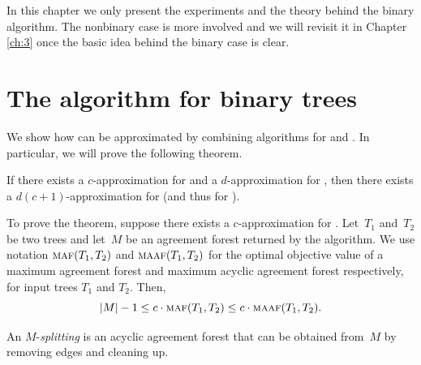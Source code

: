 In this chapter we only present the experiments and the theory behind the binary algorithm. The nonbinary case is more involved and we will revisit it in Chapter \ref{ch:3} once the basic idea behind the binary case is clear. 



\section{The algorithm for binary trees}\label{sec:binalg}

We show how \maaf can be approximated by combining algorithms for \maf and \dfvs. In particular, we will prove the following theorem.

\begin{theorem}\label{thm:appr}
If there exists a $c$-approximation for \maf and a $d$-approximation for \dfvs, then there exists a $d(c+1)$-approximation for \maaf (and thus for \mh).
\end{theorem}


To prove the theorem, suppose there exists a $c$-approximation for {\maf}. Let~$T_1$ and~$T_2$ be two trees and let~$M$ be an agreement forest returned by the algorithm. We use notation $\text{{\sc maf}}(T_1,T_2)$ and $\text{{\sc maaf}}(T_1,T_2)$ for the optimal objective value of a maximum agreement forest and maximum acyclic agreement forest respectively, for input trees $T_1$ and $T_2$. Then,
\begin{equation}\label{eq:mafmaaf}
|M| -1   \leq c \cdot \text{{\sc maf}}(T_1,T_2) \leq c\cdot \text{{\sc maaf}}(T_1,T_2).
\end{equation}

An $M$-\emph{splitting} is an acyclic agreement forest that can be obtained from~$M$ by removing edges and cleaning up.

